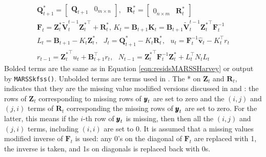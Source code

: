 \documentclass[]{article}
\def\UPS{\mbox{\boldmath $\Upsilon$}}
\def\XI{\mbox{\boldmath $\Xi$}}
\def\BB{\mbox{$\mathbf B$}}	\def\bb{\mbox{$\mathbf b$}} \def\Bb{\mbox{$\mathbf J$}} \def\Ba{\mbox{$\mathbf L$}} \def\Bm{\UPS}
\def\FF{\mbox{$\mathbf F$}} \def\ff{\mbox{$\mathbf f$}}
\def\GG{\mbox{$\mathbf G$}}	\def\gg{\mbox{$\mathbf g$}}
\def\HH{\mbox{$\mathbf H$}}	\def\hh{\mbox{$\mathbf h$}}
\def\KK{\mbox{$\mathbf K$}}
\def\QQ{\mbox{$\mathbf Q$}}	 \def\qq{\mbox{$\mathbf q$}} \def\Qb{\mbox{$\mathbf G$}}  \def\Qm{\mathbb{Q}}
\def\RR{\mbox{$\mathbf R$}}	 \def\rr{\mbox{$\mathbf r$}} \def\Rb{\mbox{$\mathbf H$}}	\def\Rm{\mathbb{R}}
\def\VV{\mbox{$\pmb{V}$}}	\def\vv{\mbox{$\pmb{v}$}}
\def\ZZ{\mbox{$\mathbf Z$}}	\def\zz{\mbox{$\mathbf z$}}	\def\Zb{\mbox{$\mathbf M$}} \def\Za{\mbox{$\mathbf N$}} \def\Zm{\XI}
\def\hatVt{\widetilde{\VV}_t^T}
\begin{document}

\begin{equation}\label{eqn:Harveyalgo}
\begin{gathered}
\QQ^*_{t+1}=\begin{bmatrix}\QQ_{t+1}&0_{m \times n}\end{bmatrix}, \mbox{    } \RR^*_t=\begin{bmatrix}0_{n \times m}&\RR_t^*\end{bmatrix}\\
\FF_t = \ZZ_t^*\widetilde{\VV}_t^{t-1}{\ZZ_t^*}^\top+\RR_t^*\mbox{,   } K_t = \BB_{t+1}\KK_t = \BB_{t+1} \widetilde{\VV}_t^{t-1}{\ZZ_t^*}^\top \FF_t^{-1}  \\
L_t = \BB_{t+1} - K_t\ZZ_t^*, \mbox{    } J_t= \QQ^*_{t+1} - K_t \RR^*_t, \mbox{    } u_t = \FF_t^{-1} \hat{\vv}_t - K_t^\top r_t\\
r_{t-1} = {\ZZ_t^*}^\top u_t + \BB_{t+1}^\top r_t, \mbox{    } N_{t-1} = {\ZZ_t^*}^\top \FF_t^{-1} \ZZ_t^* + L_t^\top N_t L_t 
\end{gathered}
\end{equation}
Bolded terms are the same as in Equation \ref{eqn:residsMARSSHarvey} or output by \texttt{MARSSkfss()}.  Unbolded terms are terms used in \citet{Harveyetal1998}.  The * on $\ZZ_t$ and $\RR_t$, indicates that they are the missing value modified versions  discussed in \citet[section 6.4]{ShumwayStoffer2006} and \citet{Holmes2012}: the rows of $\ZZ_t$ corresponding to missing rows of $\mbox{$\pmb{y}$}_t$ are set to zero and the $(i,j)$ and $(j,i)$ terms of $\RR_t$ corresponding the missing rows of $\mbox{$\pmb{y}$}_t$ are set to zero.  For the latter, this means if the $i$-th row of $\mbox{$\pmb{y}$}_t$ is missing, then then all the $(i,j)$ and $(j,i)$ terms, including $(i,i)$ are set to 0. It is assumed that a missing values modified inverse of $\FF_t$ is used: any 0's on the diagonal of $\FF_t$ are replaced with 1, the inverse is taken, and 1s on diagonals is replaced back with 0s.
\end{document}
